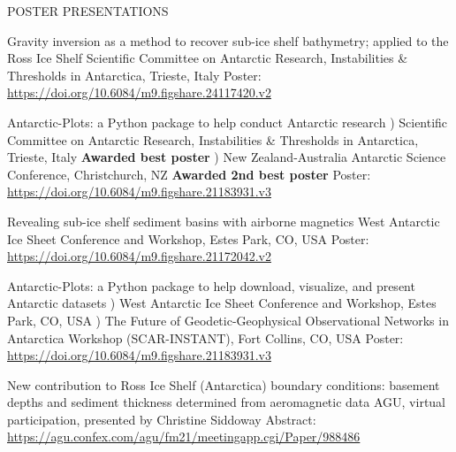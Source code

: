 \documentclass{ExpressiveResume}
\begin{document}
\noindent POSTER PRESENTATIONS \newline
\begin{cventries}

    {Gravity inversion as a method to recover sub-ice shelf bathymetry; applied to the Ross Ice Shelf}
    {Scientific Committee on Antarctic Research, Instabilities \&
        Thresholds in Antarctica, Trieste, Italy}
    {Poster: \url{https://doi.org/10.6084/m9.figshare.24117420.v2}}
    {}
    {}

    \talk{}
    {Antarctic-Plots: a Python package to help conduct Antarctic research}
    {) Scientific Committee on Antarctic Research, Instabilities \&
        Thresholds in Antarctica, Trieste, Italy
        \newline \hspace*{1em} \textbf{Awarded best poster}
    ) New Zealand-Australia Antarctic Science Conference, Christchurch, NZ
        \newline \hspace*{1em} \textbf{Awarded 2nd best poster}}
    {Poster: \url{https://doi.org/10.6084/m9.figshare.21183931.v3}}
    {}
    {}
    


    {Revealing sub-ice shelf sediment basins with airborne magnetics}
    {West Antarctic Ice Sheet Conference and Workshop, Estes Park, CO, USA}
    {Poster: \url{https://doi.org/10.6084/m9.figshare.21172042.v2}}
    {}
    {}

    \talk{} %
    {Antarctic-Plots: a Python package to help download, visualize, and present Antarctic datasets}
    {) West Antarctic Ice Sheet Conference and Workshop, Estes Park, CO, USA
        ) The Future of Geodetic-Geophysical Observational Networks in
        Antarctica Workshop (SCAR-INSTANT), Fort Collins, CO, USA
    }
    {Poster: \url{https://doi.org/10.6084/m9.figshare.21183931.v3}}
    {}
    {}

    {New contribution to Ross Ice Shelf (Antarctica) boundary conditions: basement depths and sediment thickness determined from aeromagnetic data}
    {AGU, virtual participation, presented by Christine Siddoway}
    {Abstract: \url{https://agu.confex.com/agu/fm21/meetingapp.cgi/Paper/988486}}
    {}
    {}


\end{cventries}
\end{document}
